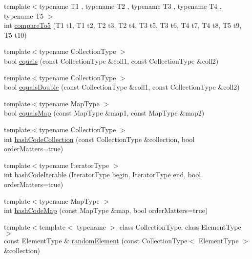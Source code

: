 \begin{DoxyCompactItemize}
\item 
{\footnotesize template$<$typename T1 , typename T2 , typename T3 , typename T4 , typename T5 $>$ }\\int \mbox{\hyperlink{namespacestanfordcpplib_1_1collections_a411062409fa1acb094ac1260ccfa135e}{compare\+To5}} (T1 t1, T1 t2, T2 t3, T2 t4, T3 t5, T3 t6, T4 t7, T4 t8, T5 t9, T5 t10)
\item 
{\footnotesize template$<$typename Collection\+Type $>$ }\\bool \mbox{\hyperlink{namespacestanfordcpplib_1_1collections_a7ffc19787c4a86528a81d8a7b2d6d963}{equals}} (const Collection\+Type \&coll1, const Collection\+Type \&coll2)
\item 
{\footnotesize template$<$typename Collection\+Type $>$ }\\bool \mbox{\hyperlink{namespacestanfordcpplib_1_1collections_ae626c392f1fc8926386ed9e5c232524c}{equals\+Double}} (const Collection\+Type \&coll1, const Collection\+Type \&coll2)
\item 
{\footnotesize template$<$typename Map\+Type $>$ }\\bool \mbox{\hyperlink{namespacestanfordcpplib_1_1collections_af183b0e3f1ca38661646f2a5ba389090}{equals\+Map}} (const Map\+Type \&map1, const Map\+Type \&map2)
\item 
{\footnotesize template$<$typename Collection\+Type $>$ }\\int \mbox{\hyperlink{namespacestanfordcpplib_1_1collections_a4bde4f51efc44d308c1c5f34a3ce68f0}{hash\+Code\+Collection}} (const Collection\+Type \&collection, bool order\+Matters=true)
\item 
{\footnotesize template$<$typename Iterator\+Type $>$ }\\int \mbox{\hyperlink{namespacestanfordcpplib_1_1collections_ab25ff6237487d8f8de80deac63917870}{hash\+Code\+Iterable}} (Iterator\+Type begin, Iterator\+Type end, bool order\+Matters=true)
\item 
{\footnotesize template$<$typename Map\+Type $>$ }\\int \mbox{\hyperlink{namespacestanfordcpplib_1_1collections_aac709e6defed173090838d4115bdfcc5}{hash\+Code\+Map}} (const Map\+Type \&map, bool order\+Matters=true)
\item 
{\footnotesize template$<$template$<$ typename $>$ class Collection\+Type, class Element\+Type $>$ }\\const Element\+Type \& \mbox{\hyperlink{namespacestanfordcpplib_1_1collections_abb527b0a95625acf221bb506fcdf6f65}{random\+Element}} (const Collection\+Type$<$ Element\+Type $>$ \&collection)

\end{DoxyCompactItemize}
